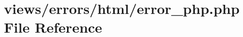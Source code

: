 \hypertarget{html_2error__php_8php}{}\section{views/errors/html/error\+\_\+php.php File Reference}
\label{html_2error__php_8php}
